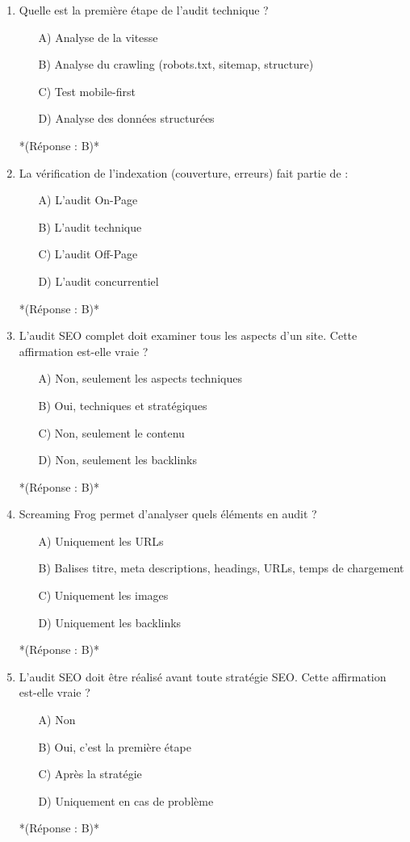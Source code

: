 \documentclass[12pt,a4paper,twoside]{report}
\begin{document}
\begin{enumerate}
    \item Quelle est la première étape de l'audit technique ?
    \begin{itemize}
        \item[A)] Analyse de la vitesse
        \item[B)] Analyse du crawling (robots.txt, sitemap, structure)
        \item[C)] Test mobile-first
        \item[D)] Analyse des données structurées
    \end{itemize}
    *(Réponse : B)*

    \item La vérification de l'indexation (couverture, erreurs) fait partie de :
    \begin{itemize}
        \item[A)] L'audit On-Page
        \item[B)] L'audit technique
        \item[C)] L'audit Off-Page
        \item[D)] L'audit concurrentiel
    \end{itemize}
    *(Réponse : B)*

    \item L'audit SEO complet doit examiner tous les aspects d'un site. Cette affirmation est-elle vraie ?
    \begin{itemize}
        \item[A)] Non, seulement les aspects techniques
        \item[B)] Oui, techniques et stratégiques
        \item[C)] Non, seulement le contenu
        \item[D)] Non, seulement les backlinks
    \end{itemize}
    *(Réponse : B)*

    \item Screaming Frog permet d'analyser quels éléments en audit ?
    \begin{itemize}
        \item[A)] Uniquement les URLs
        \item[B)] Balises titre, meta descriptions, headings, URLs, temps de chargement
        \item[C)] Uniquement les images
        \item[D)] Uniquement les backlinks
    \end{itemize}
    *(Réponse : B)*

    \item L'audit SEO doit être réalisé avant toute stratégie SEO. Cette affirmation est-elle vraie ?
    \begin{itemize}
        \item[A)] Non
        \item[B)] Oui, c'est la première étape
        \item[C)] Après la stratégie
        \item[D)] Uniquement en cas de problème
    \end{itemize}
    *(Réponse : B)*


\end{enumerate}
\end{document}
